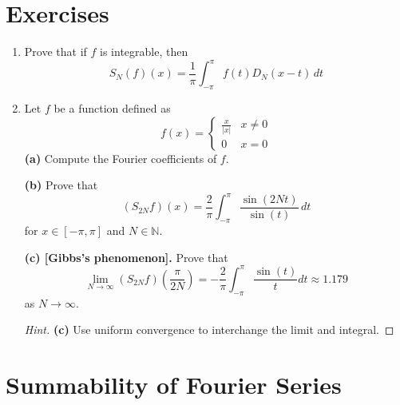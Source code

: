 \documentclass{article}
\theoremstyle{remark}
\theoremstyle{exercise}
\theoremstyle{definition}
\begin{document}
\section*{Exercises}
\begin{enumerate}
    \item Prove that if \(f\) is integrable, then
    \[
    S_N(f)(x) = \frac{1}{\pi}\int_{-\pi}^{\pi}f(t)D_N(x-t)\,dt
    \]
    \item Let \(f\) be a function defined as
    \[
    f(x) = \begin{cases}
        \frac{x}{|x|} & x \neq 0\\
        0             & x = 0
    \end{cases}
    \]
    \textbf{(a)} Compute the Fourier coefficients of $f$.

    \textbf{(b)} Prove that
    \[
    (S_{2N} f)(x) = \frac{2}{\pi} \int_{-\pi}^{\pi} \frac{\sin(2Nt)}{\sin(t)} \,dt
    \]
    for $x \in [-\pi,\pi]$ and $N \in \mathbb{N}$.

    \textbf{(c) [Gibbs's phenomenon].} Prove that
    \[
    \lim_{N \to \infty}(S_{2N} f)(\frac{\pi}{2N}) = -\frac{2}{\pi}\int_{-\pi}^{\pi} \frac{\sin(t)}{t} dt \approx 1.179
    \]
    as $N \to \infty$.

    \begin{proof}[Hint]
        \textbf{(c)} Use uniform convergence to interchange the limit and integral.
    \end{proof}
\end{enumerate}
\section{Summability of Fourier Series}
\end{document}
